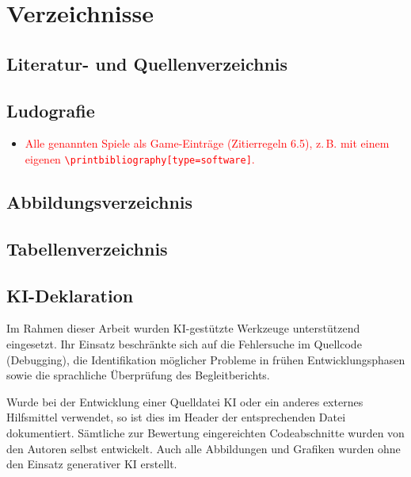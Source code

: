 \documentclass[../Main.tex]{subfiles}
\begin{document}
\section{Verzeichnisse}

\subsection{Literatur- und Quellenverzeichnis}

\printbibliography[heading=none]

\subsection{Ludografie}

\begin{itemize}[leftmargin=1.5cm]
    \item \textcolor{red}{Alle genannten Spiele als Game-Einträge (Zitierregeln 6.5), z.\,B. mit einem eigenen \texttt{\textbackslash printbibliography[type=software]}.}
\end{itemize}

\subsection{Abbildungsverzeichnis}

\listoffigures

\subsection{Tabellenverzeichnis}

\listoftables

\subsection{KI-Deklaration}

Im Rahmen dieser Arbeit wurden KI-gestützte Werkzeuge unterstützend eingesetzt. Ihr Einsatz beschränkte sich auf die Fehlersuche im Quellcode (Debugging), die Identifikation möglicher Probleme in frühen Entwicklungsphasen sowie die sprachliche Überprüfung des Begleitberichts.

Wurde bei der Entwicklung einer Quelldatei KI oder ein anderes externes Hilfsmittel verwendet, so ist dies im Header der entsprechenden Datei dokumentiert. Sämtliche zur Bewertung eingereichten Codeabschnitte wurden von den Autoren selbst entwickelt. Auch alle Abbildungen und Grafiken wurden ohne den Einsatz generativer KI erstellt.
\end{document}
